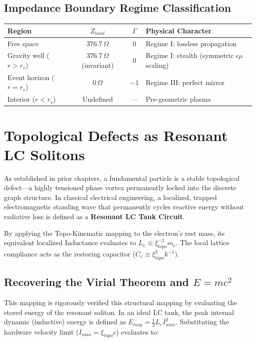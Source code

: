\subsection*{Impedance Boundary Regime Classification}
\begin{center}
\small
\renewcommand{\arraystretch}{1.2}
\begin{tabularx}{\textwidth}{@{}lccX@{}}
\toprule
\textbf{Region} & \textbf{$Z_{local}$} & \textbf{$\Gamma$} & \textbf{Physical Character} \\
\midrule
Free space             & $376.7\,\Omega$ & $0$   & Regime I: lossless propagation \\
Gravity well ($r > r_s$) & $376.7\,\Omega$ (invariant) & $0$   & Regime I: stealth (symmetric $\epsilon\mu$ scaling) \\
Event horizon ($r = r_s$) & $0\,\Omega$  & $-1$ & Regime III: perfect mirror \\
Interior ($r < r_s$)     & Undefined    & ---   & Pre-geometric plasma \\
\bottomrule
\end{tabularx}
\end{center}\section{Topological Defects as Resonant LC Solitons}

As established in prior chapters, a fundamental particle is a stable topological defect---a highly
tensioned phase vortex permanently locked into the discrete graph structure. In classical
electrical engineering, a localized, trapped electromagnetic standing wave that permanently
cycles reactive energy without radiative loss is defined as a \textbf{Resonant LC Tank Circuit}.

By applying the Topo-Kinematic mapping to the electron's rest mass, its equivalent localized
Inductance evaluates to $L_e \equiv \xi_{topo}^{-2} m_e$. The local lattice compliance acts as the restoring
capacitor ($C_e \equiv \xi_{topo}^2 k^{-1}$).

\subsection{Recovering the Virial Theorem and $E=mc^2$}

This mapping is rigorously verified this structural mapping by evaluating the stored energy of the
resonant soliton. In an ideal LC tank, the peak internal dynamic (inductive) energy is defined
as $E_{mag} = \frac{1}{2} L_e I_{max}^2$. Substituting the hardware velocity limit ($I_{max} = \xi_{topo} c$) evaluates to:

